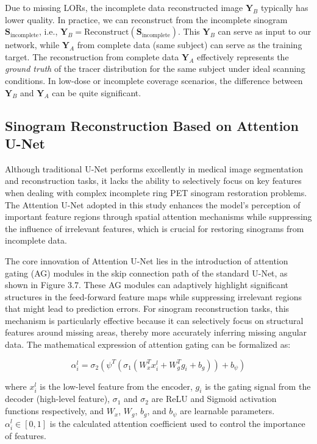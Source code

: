 \documentclass[
reprint,
superscriptaddress,
nofootinbib,
amsmath,amssymb,
aps,
prd,
]{revtex4-2}
\begin{document}
Due to missing LORs, the incomplete data reconstructed image \(\mathbf{Y}_B\) typically has lower quality. In practice, we can reconstruct from the incomplete sinogram \(\mathbf{S}_{\text{incomplete}}\), i.e., \(\mathbf{Y}_B = \text{Reconstruct}(\mathbf{S}_{\text{incomplete}})\). This \(\mathbf{Y}_B\) can serve as input to our network, while \(\mathbf{Y}_A\) from complete data (same subject) can serve as the training target. The reconstruction from complete data \(\mathbf{Y}_A\) effectively represents the \emph{ground truth} of the tracer distribution for the same subject under ideal scanning conditions. In low-dose or incomplete coverage scenarios, the difference between \(\mathbf{Y}_B\) and \(\mathbf{Y}_A\) can be quite significant.

\subsection{Sinogram Reconstruction Based on Attention U-Net}

Although traditional U-Net performs excellently in medical image segmentation and reconstruction tasks, it lacks the ability to selectively focus on key features when dealing with complex incomplete ring PET sinogram restoration problems. The Attention U-Net adopted in this study enhances the model's perception of important feature regions through spatial attention mechanisms while suppressing the influence of irrelevant features, which is crucial for restoring sinograms from incomplete data.

The core innovation of Attention U-Net lies in the introduction of attention gating (AG) modules in the skip connection path of the standard U-Net, as shown in Figure 3.7. These AG modules can adaptively highlight significant structures in the feed-forward feature maps while suppressing irrelevant regions that might lead to prediction errors. For sinogram reconstruction tasks, this mechanism is particularly effective because it can selectively focus on structural features around missing areas, thereby more accurately inferring missing angular data. The mathematical expression of attention gating can be formalized as:

\begin{equation}
\alpha_i^l = \sigma_2(\psi^T(\sigma_1(W_x^T x_i^l + W_g^T g_i + b_g)) + b_\psi)
\end{equation}

where $x_i^l$ is the low-level feature from the encoder, $g_i$ is the gating signal from the decoder (high-level feature), $\sigma_1$ and $\sigma_2$ are ReLU and Sigmoid activation functions respectively, and $W_x$, $W_g$, $b_g$, and $b_\psi$ are learnable parameters. $\alpha_i^l \in [0,1]$ is the calculated attention coefficient used to control the importance of features.
\end{document}
